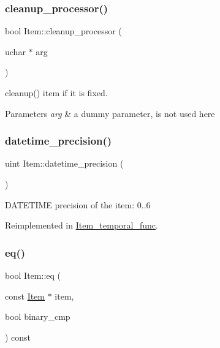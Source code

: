 \mbox{\label{classItem_a92291b9ff9c01c3e6ab721a209c536c2}} 
\subsubsection{\texorpdfstring{cleanup\+\_\+processor()}{cleanup\_processor()}}
{\footnotesize\ttfamily bool Item\+::cleanup\+\_\+processor (\begin{DoxyParamCaption}\item[{uchar $\ast$}]{arg }\end{DoxyParamCaption})\hspace{0.3cm}{\ttfamily [virtual]}}

cleanup() item if it is \textquotesingle{}fixed\textquotesingle{}.


\begin{DoxyParams}{Parameters}
{\em arg} & a dummy parameter, is not used here \\
\hline
\end{DoxyParams}
\mbox{\label{classItem_a7d01a73ce07ab1b1503c2de56668fdc1}} 
\subsubsection{\texorpdfstring{datetime\+\_\+precision()}{datetime\_precision()}}
{\footnotesize\ttfamily uint Item\+::datetime\+\_\+precision (\begin{DoxyParamCaption}{ }\end{DoxyParamCaption})\hspace{0.3cm}{\ttfamily [virtual]}}

D\+A\+T\+E\+T\+I\+ME precision of the item\+: 0..6 

Reimplemented in \mbox{\hyperlink{classItem__temporal__func_ad8de60fc778a47b3e3c14df2ef3d8f38}{Item\+\_\+temporal\+\_\+func}}.

\mbox{\label{classItem_af0957bbdb9a256de0cd29f1adcae28be}} 
\subsubsection{\texorpdfstring{eq()}{eq()}}
{\footnotesize\ttfamily bool Item\+::eq (\begin{DoxyParamCaption}\item[{const \mbox{\hyperlink{classItem}{Item}} $\ast$}]{item,  }\item[{bool}]{binary\+\_\+cmp }\end{DoxyParamCaption}) const\hspace{0.3cm}{\ttfamily [virtual]}}

